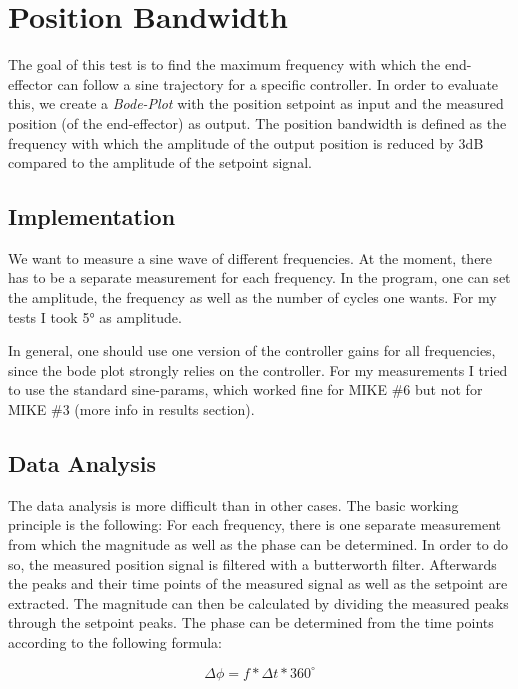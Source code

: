 \section{Position Bandwidth}

The goal of this test is to find the maximum frequency with which the end-effector can follow a sine trajectory for a specific controller. In order to evaluate this, we create a \emph{Bode-Plot} with the position setpoint as input and the measured position (of the end-effector) as output. The position bandwidth is defined as the frequency with which the amplitude of the output position is reduced by 3dB compared to the amplitude of the setpoint signal.

\subsection{Implementation}

We want to measure a sine wave of different frequencies. At the moment, there has to be a separate measurement for each frequency. In the program, one can set the amplitude, the frequency as well as the number of cycles one wants. For my tests I took 5° as amplitude.

In general, one should use one version of the controller gains for all frequencies, since the bode plot strongly relies on the controller. For my measurements I tried to use the standard sine-params, which worked fine for MIKE \#6 but not for MIKE \#3 (more info in results section).

\subsection{Data Analysis}

The data analysis is more difficult than in other cases. The basic working principle is the following: For each frequency, there is one separate measurement from which the magnitude as well as the phase can be determined. In order to do so, the measured position signal is filtered with a butterworth filter. Afterwards the peaks and their time points of the measured signal as well as the setpoint are extracted. The magnitude can then be calculated by dividing the measured peaks through the setpoint peaks. The phase can be determined from the time points according to the following formula:

\begin{equation}
    \Delta\phi = f*\Delta t*360^\circ
\end{equation}

